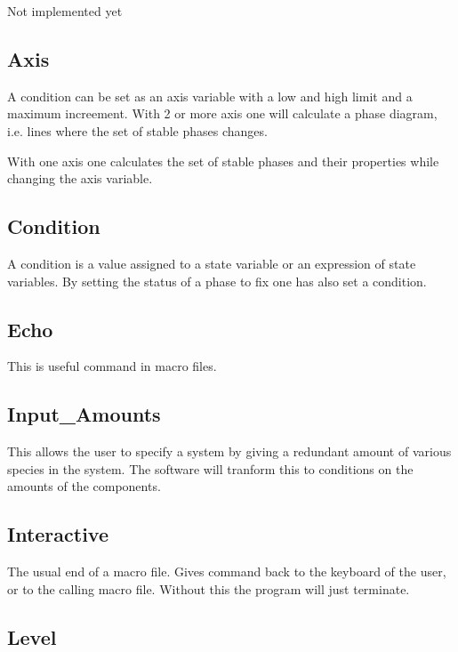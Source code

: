 \documentclass[12pt]{article}
\begin{document}
Not implemented yet

\subsection{Axis}

A condition can be set as an axis variable with a low and high limit
and a maximum increement.  With 2 or more axis one will calculate a
phase diagram, i.e. lines where the set of stable phases changes.

With one axis one calculates the set of stable phases and their
properties while changing the axis variable.

\subsection{Condition}

A condition is a value assigned to a state variable or an expression
of state variables.  By setting the status of a phase to fix one has
also set a condition.

\subsection{Echo}

This is useful command in macro files.

\subsection{Input\_Amounts}

This allows the user to specify a system by giving a redundant amount
of various species in the system.  The software will tranform this to
conditions on the amounts of the components.

\subsection{Interactive}

The usual end of a macro file.  Gives command back to the keyboard of
the user, or to the calling macro file.  Without this the program will
just terminate.

\subsection{Level}
\end{document}
